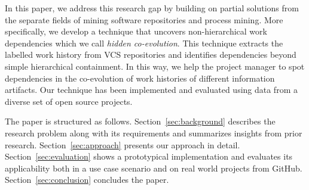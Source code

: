 In this paper, we address this research gap by building on partial solutions from the separate fields of mining software repositories and process mining. More specifically, we develop a technique that uncovers non-hierarchical work dependencies which we call \emph{hidden co-evolution}. This technique extracts the labelled work history from VCS repositories and identifies dependencies beyond simple hierarchical containment. In this way, we help the project manager to spot dependencies in the co-evolution of work histories of different information artifacts. Our technique has been implemented and evaluated using data from a diverse set of open source projects.


The paper is structured as follows. Section~\ref{sec:background} describes the research problem along with its requirements and summarizes insights from prior research. Section~\ref{sec:approach} presents our approach in detail. Section~\ref{sec:evaluation} shows a prototypical implementation and evaluates its applicability both in a use case scenario and on real world projects from GitHub. Section~\ref{sec:conclusion} concludes the paper.


